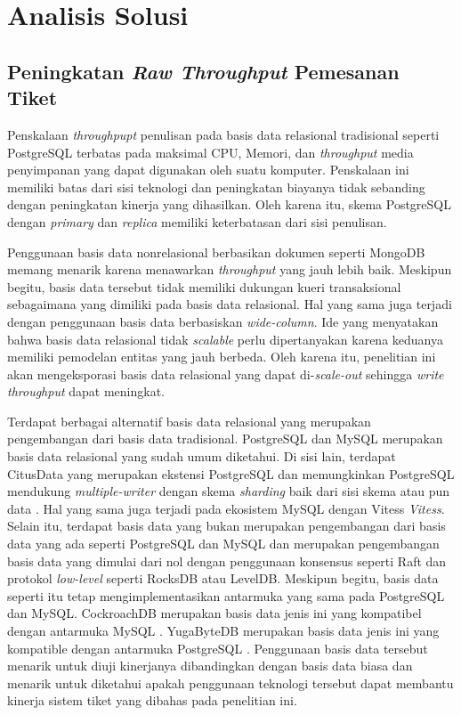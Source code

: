 \section{Analisis Solusi}

\subsection{Peningkatan \textit{Raw Throughput} Pemesanan Tiket}

Penskalaan \textit{throughpupt} penulisan pada basis data relasional tradisional seperti PostgreSQL terbatas pada maksimal CPU, Memori, dan \textit{throughput} media penyimpanan yang dapat digunakan oleh suatu komputer. Penskalaan ini memiliki batas dari sisi teknologi dan peningkatan biayanya tidak sebanding dengan peningkatan kinerja yang dihasilkan. Oleh karena itu, skema PostgreSQL dengan \textit{primary} dan \textit{replica} memiliki keterbatasan dari sisi penulisan.

Penggunaan basis data nonrelasional berbasikan dokumen seperti MongoDB memang menarik karena menawarkan \textit{throughput} yang jauh lebih baik. Meskipun begitu, basis data tersebut tidak memiliki dukungan kueri transaksional sebagaimana yang dimiliki pada basis data relasional. Hal yang sama juga terjadi dengan penggunaan basis data berbasiskan \textit{wide-column}. Ide yang menyatakan bahwa basis data relasional tidak \textit{scalable} perlu dipertanyakan karena keduanya memiliki pemodelan entitas yang jauh berbeda. Oleh karena itu, penelitian ini akan mengeksporasi basis data relasional yang dapat di-\textit{scale-out} sehingga \textit{write throughput} dapat meningkat.

Terdapat berbagai alternatif basis data relasional yang merupakan pengembangan dari basis data tradisional. PostgreSQL dan MySQL merupakan basis data relasional yang sudah umum diketahui. Di sisi lain, terdapat CitusData yang merupakan ekstensi PostgreSQL dan memungkinkan PostgreSQL mendukung \textit{multiple-writer} dengan skema \textit{sharding} baik dari sisi skema atau pun data \parencite{citus}. Hal yang sama juga terjadi pada ekosistem MySQL dengan Vitess \textit{Vitess}. Selain itu, terdapat basis data yang bukan merupakan pengembangan dari basis data yang ada seperti PostgreSQL dan MySQL dan merupakan pengembangan basis data yang dimulai dari nol dengan penggunaan konsensus seperti Raft dan protokol \textit{low-level} seperti RocksDB atau LevelDB. Meskipun begitu, basis data seperti itu tetap mengimplementasikan antarmuka yang sama pada PostgreSQL dan MySQL. CockroachDB merupakan basis data jenis ini yang kompatibel dengan antarmuka MySQL \parencite{cockroachDB}. YugaByteDB merupakan basis data jenis ini yang kompatible dengan antarmuka PostgreSQL \parencite{yugabyte}. Penggunaan basis data tersebut menarik untuk diuji kinerjanya dibandingkan dengan basis data biasa dan menarik untuk diketahui apakah penggunaan teknologi tersebut dapat membantu kinerja sistem tiket yang dibahas pada penelitian ini.

